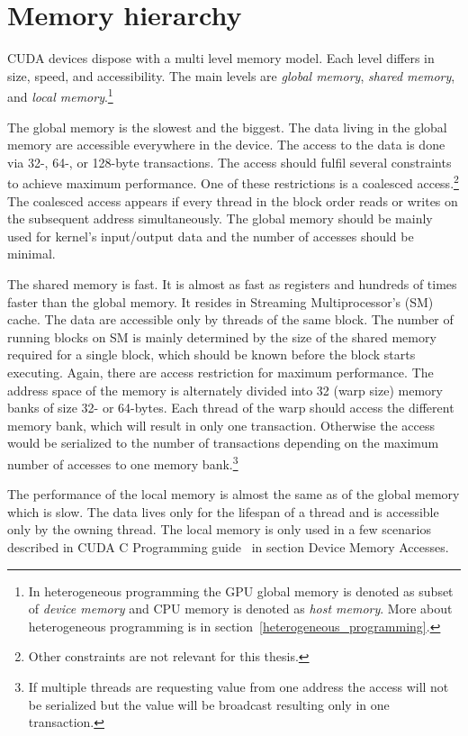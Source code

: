 \documentclass[12pt,oneside]{fithesis2}
\begin{document}
\section{Memory hierarchy}
\label{memory_hiearchy}

CUDA devices dispose with a multi level memory model. Each level differs in size, speed, and accessibility. The main levels are \emph{global memory}, \emph{shared memory}, and \emph{local memory}.\footnote{In heterogeneous programming the GPU global memory is denoted as subset of \emph{device memory} and CPU memory is denoted as \emph{host memory}. More about heterogeneous programming is in section~\ref{heterogeneous_programming}.}~\cite{cuda_guide}

The global memory is the slowest and the biggest. The data living in the global memory are accessible everywhere in the device. The access to the data is done via 32-, 64-, or 128-byte transactions. The access should fulfil several constraints to achieve maximum performance. One of these restrictions is a coalesced access.\footnote{Other constraints are not relevant for this thesis.} The coalesced access appears if every thread in the block order reads or writes on the subsequent address simultaneously. The global memory should be mainly used for kernel's input/output data and the number of accesses should be minimal.

The shared memory is fast. It is almost as fast as registers and hundreds of times faster than the global memory. It resides in Streaming Multiprocessor's (SM) cache. The data are accessible only by threads of the same block. The number of running blocks on SM is mainly determined by the size of the shared memory required for a single block, which should be known before the block starts executing. Again, there are access restriction for maximum performance. The address space of the memory is alternately divided into 32 (warp size) memory banks of size 32- or 64-bytes. Each thread of the warp should access the different memory bank, which will result in only one transaction. Otherwise the access would be serialized to the number of transactions depending on the maximum number of accesses to one memory bank.\footnote{If multiple threads are requesting value from one address the access will not be serialized but the value will be broadcast resulting only in one transaction.}

The performance of the local memory is almost the same as of the global memory which is slow. The data lives only for the lifespan of a thread and is accessible only by the owning thread. The local memory is only used in a few scenarios described in CUDA C Programming guide~\cite{cuda_guide} in section Device Memory Accesses.
\end{document}
